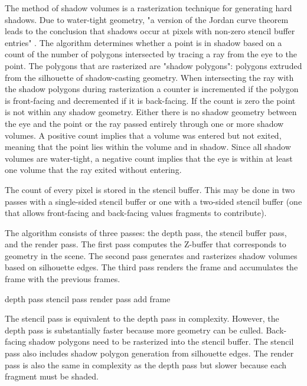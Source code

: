 \documentclass[12pt]{article}
\begin{document}
The method of shadow volumes is a rasterization technique for generating hard shadows. Due to water-tight geometry, "a version of the Jordan curve theorem leads to the conclusion that shadows occur at pixels with non-zero stencil buffer entries" \cite{Sen:2003:SSM:882262.882301}.
The algorithm determines whether a point is in shadow based on a count of the number of polygons intersected by tracing a ray from the eye to the point. The polygons that are rasterized are "shadow polygons": polygons extruded from the silhouette of shadow-casting geometry.
When intersecting the ray with the shadow polygons during rasterization a counter is incremented if the polygon is front-facing and decremented if it is back-facing. If the count is zero the point is not within any shadow geometry. Either there is no shadow geometry between the eye and the point or the ray passed entirely through one or more shadow volumes. A positive count implies that a volume was entered but not exited, meaning that the point lies within the volume and in shadow. Since all shadow volumes are water-tight, a negative count implies that the eye is within at least one volume that the ray exited without entering.

The count of every pixel is stored in the stencil buffer. This may be done in two passes with a single-sided stencil buffer or one with a two-sided stencil buffer (one that allows front-facing and back-facing values fragments to contribute).

The algorithm consists of three passes: the depth pass, the stencil buffer pass, and the render pass. The first pass computes the Z-buffer that corresponds to geometry in the scene.
The second pass generates and rasterizes shadow volumes based on silhouette edges. The third pass renders the frame and accumulates the frame with the previous frames.

\begin{algorithm}
depth pass\;
{
	stencil pass\;
	render pass\;
	add frame\;
}
\end{algorithm}

The stencil pass is equivalent to the depth pass in complexity. However, the depth pass is substantially faster because more geometry can be culled. Back-facing shadow polygons need to be rasterized into the stencil buffer. The stencil pass also includes shadow polygon generation from silhouette edges. The render pass is also the same in complexity as the depth pass but slower because each fragment must be shaded.
\end{document}
